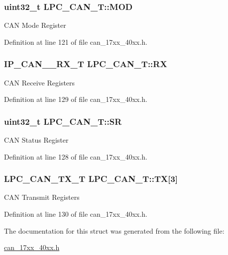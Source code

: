 \subsubsection[{\texorpdfstring{M\+OD}{MOD}}]{ uint32\+\_\+t L\+P\+C\+\_\+\+C\+A\+N\+\_\+\+T\+::\+M\+OD}\hypertarget{structLPC__CAN__T_a8bc39ce9227ace84de55a902d60cb11e}{}\label{structLPC__CAN__T_a8bc39ce9227ace84de55a902d60cb11e}
C\+AN Mode Register 

Definition at line 121 of file can\+\_\+17xx\+\_\+40xx.\+h.

\subsubsection[{\texorpdfstring{RX}{RX}}]{ {\bf I\+P\+\_\+\+C\+A\+N\+\_\+\_\+\+R\+X\+\_\+T} L\+P\+C\+\_\+\+C\+A\+N\+\_\+\+T\+::\+RX}\hypertarget{structLPC__CAN__T_a9890a3ed561ea1e0fbce9a2d6321ac39}{}\label{structLPC__CAN__T_a9890a3ed561ea1e0fbce9a2d6321ac39}
C\+AN Receive Registers 

Definition at line 129 of file can\+\_\+17xx\+\_\+40xx.\+h.

\subsubsection[{\texorpdfstring{SR}{SR}}]{ uint32\+\_\+t L\+P\+C\+\_\+\+C\+A\+N\+\_\+\+T\+::\+SR}\hypertarget{structLPC__CAN__T_a16d0fa727f1fbcff03739b512b00806d}{}\label{structLPC__CAN__T_a16d0fa727f1fbcff03739b512b00806d}
C\+AN Status Register 

Definition at line 128 of file can\+\_\+17xx\+\_\+40xx.\+h.

\subsubsection[{\texorpdfstring{TX}{TX}}]{ {\bf L\+P\+C\+\_\+\+C\+A\+N\+\_\+\+T\+X\+\_\+T} L\+P\+C\+\_\+\+C\+A\+N\+\_\+\+T\+::\+TX\mbox{[}3\mbox{]}}\hypertarget{structLPC__CAN__T_ad24f43de6447283b4379922cc1c83a1d}{}\label{structLPC__CAN__T_ad24f43de6447283b4379922cc1c83a1d}
C\+AN Transmit Registers 

Definition at line 130 of file can\+\_\+17xx\+\_\+40xx.\+h.



The documentation for this struct was generated from the following file\+:\begin{DoxyCompactItemize}
\item 
\hyperlink{can__17xx__40xx_8h}{can\+\_\+17xx\+\_\+40xx.\+h}\end{DoxyCompactItemize}
